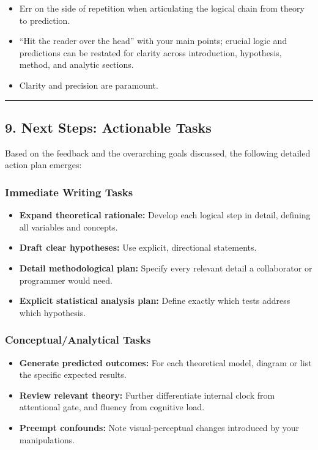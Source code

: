 \documentclass[
]{article}
\providecommand{\tightlist}{%
  \setlength{\itemsep}{0pt}\setlength{\parskip}{0pt}}
\begin{document}
\begin{itemize}
\tightlist
\item
  Err on the side of repetition when articulating the logical chain from
  theory to prediction.
\item
  ``Hit the reader over the head'' with your main points; crucial logic
  and predictions can be restated for clarity across introduction,
  hypothesis, method, and analytic sections.
\item
  Clarity and precision are paramount.
\end{itemize}

\begin{center}\rule{0.5\linewidth}{0.5pt}\end{center}

\subsection{9. Next Steps: Actionable
Tasks}\label{next-steps-actionable-tasks}

Based on the feedback and the overarching goals discussed, the following
detailed action plan emerges:

\subsubsection{Immediate Writing Tasks}\label{immediate-writing-tasks}

\begin{itemize}
\tightlist
\item
  \textbf{Expand theoretical rationale:} Develop each logical step in
  detail, defining all variables and concepts.
\item
  \textbf{Draft clear hypotheses:} Use explicit, directional statements.
\item
  \textbf{Detail methodological plan:} Specify every relevant detail a
  collaborator or programmer would need.
\item
  \textbf{Explicit statistical analysis plan:} Define exactly which
  tests address which hypothesis.
\end{itemize}

\subsubsection{Conceptual/Analytical
Tasks}\label{conceptualanalytical-tasks}

\begin{itemize}
\tightlist
\item
  \textbf{Generate predicted outcomes:} For each theoretical model,
  diagram or list the specific expected results.
\item
  \textbf{Review relevant theory:} Further differentiate internal clock
  from attentional gate, and fluency from cognitive load.
\item
  \textbf{Preempt confounds:} Note visual-perceptual changes introduced
  by your manipulations.
\end{itemize}
\end{document}

